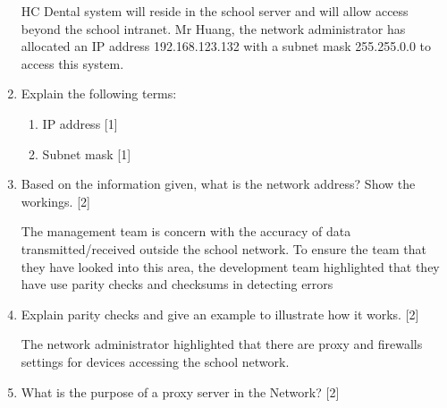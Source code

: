 \begin{enumerate}
HC Dental system will reside in the school server and will allow access
beyond the school intranet. Mr Huang, the network administrator has
allocated an IP address 192.168.123.132 with a subnet mask 255.255.0.0
to access this system. 
\item Explain the following terms: 
\begin{enumerate}
\item IP address \hfill{}{[}1{]}
\item Subnet mask \hfill{}{[}1{]}
\end{enumerate}
\item Based on the information given, what is the network address? Show
the workings. \hfill{}{[}2{]}

The management team is concern with the accuracy of data transmitted/received
outside the school network. To ensure the team that they have looked
into this area, the development team highlighted that they have use
parity checks and checksums in detecting errors 
\item Explain parity checks and give an example to illustrate how it works.
\hfill{}{[}2{]}

The network administrator highlighted that there are proxy and firewalls
settings for devices accessing the school network. 
\item What is the purpose of a proxy server in the Network? \hfill{}{[}2{]}
\end{enumerate}